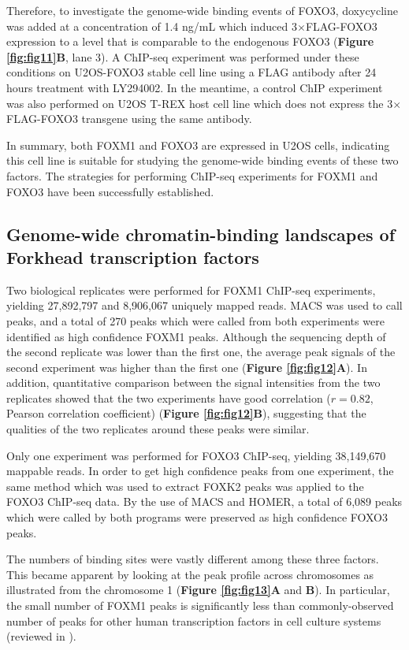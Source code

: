 Therefore, to investigate the genome-wide binding events of FOXO3, doxycycline was added at a concentration of 1.4 ng/mL which induced 3$\times$FLAG-FOXO3 expression to a level that is comparable to the endogenous FOXO3 (\textbf{Figure \ref{fig:fig11}B}, lane 3). A ChIP-seq experiment was performed under these conditions on U2OS-FOXO3 stable cell line using a FLAG antibody after 24 hours treatment with LY294002. In the meantime, a control ChIP experiment was also performed on U2OS T-REX host cell line which does not express the 3$\times$FLAG-FOXO3 transgene using the same antibody.

In summary, both FOXM1 and FOXO3 are expressed in U2OS cells, indicating this cell line is suitable for studying the genome-wide binding events of these two factors. The strategies for performing ChIP-seq experiments for FOXM1 and FOXO3 have been successfully established.

\subsection{Genome-wide chromatin-binding landscapes of Forkhead transcription factors}

Two biological replicates were performed for FOXM1 ChIP-seq experiments, yielding 27,892,797 and 8,906,067 uniquely mapped reads. MACS was used to call peaks, and a total of 270 peaks which were called from both experiments were identified as high confidence FOXM1 peaks. Although the sequencing depth of the second replicate was lower than the first one, the average peak signals of the second experiment was higher than the first one (\textbf{Figure \ref{fig:fig12}A}). In addition, quantitative comparison between the signal intensities from the two replicates showed that the two experiments have good correlation ($r=0.82$, Pearson correlation coefficient) (\textbf{Figure \ref{fig:fig12}B}), suggesting that the qualities of the two replicates around these peaks were similar.

Only one experiment was performed for FOXO3 ChIP-seq, yielding 38,149,670 mappable reads. In order to get high confidence peaks from one experiment, the same method which was used to extract FOXK2 peaks was applied to the FOXO3 ChIP-seq data. By the use of MACS and HOMER, a total of 6,089 peaks which were called by both programs were preserved as high confidence FOXO3 peaks.

The numbers of binding sites were vastly different among these three factors. This became apparent by looking at the peak profile across chromosomes as illustrated from the chromosome 1 (\textbf{Figure \ref{fig:fig13}A} and \textbf{B}). In particular, the small number of FOXM1 peaks is significantly less than commonly-observed number of peaks for other human transcription factors in cell culture systems (reviewed in \cite{macquarrie2011genome-wide}).

